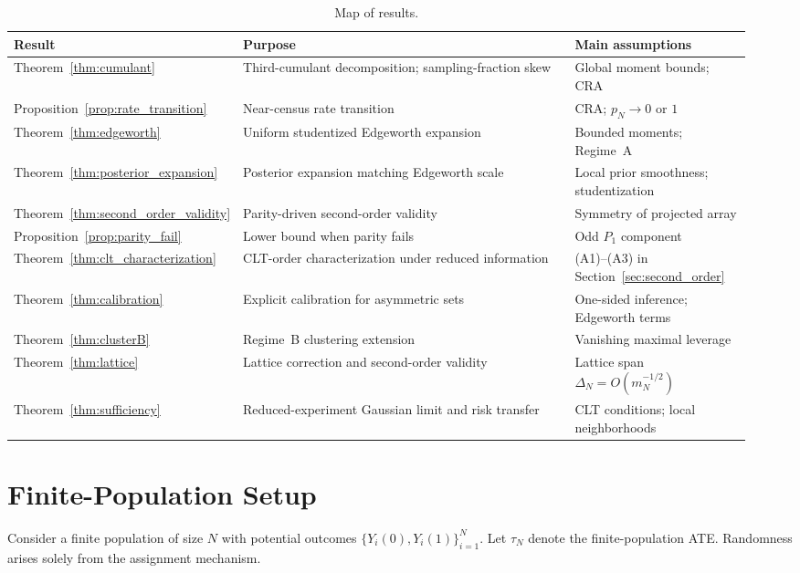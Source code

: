 \documentclass[aos]{imsart}
\theoremstyle{definition}
\theoremstyle{plain}
\newcommand{\mN}{m_N}
\begin{document}
\begin{table}[t]
\centering
\small
\setlength{\tabcolsep}{3pt}
\begin{tabular}{>{\raggedright\arraybackslash}p{0.25\linewidth}%
                >{\raggedright\arraybackslash}p{0.45\linewidth}%
                >{\raggedright\arraybackslash}p{0.24\linewidth}}
\toprule
Result & Purpose & Main assumptions \\
\midrule
Theorem~\ref{thm:cumulant} & Third-cumulant decomposition; sampling-fraction skew & Global moment bounds; CRA \\
Proposition~\ref{prop:rate_transition} & Near-census rate transition & CRA; $p_N\to 0$ or $1$ \\
Theorem~\ref{thm:edgeworth} & Uniform studentized Edgeworth expansion & Bounded moments; Regime~A \\
Theorem~\ref{thm:posterior_expansion} & Posterior expansion matching Edgeworth scale & Local prior smoothness; studentization \\
Theorem~\ref{thm:second_order_validity} & Parity-driven second-order validity & Symmetry of projected array \\
Proposition~\ref{prop:parity_fail} & Lower bound when parity fails & Odd $P_1$ component \\
Theorem~\ref{thm:clt_characterization} & CLT-order characterization under reduced information & (A1)--(A3) in Section~\ref{sec:second_order} \\
Theorem~\ref{thm:calibration} & Explicit calibration for asymmetric sets & One-sided inference; Edgeworth terms \\
Theorem~\ref{thm:clusterB} & Regime~B clustering extension & Vanishing maximal leverage \\
Theorem~\ref{thm:lattice} & Lattice correction and second-order validity & Lattice span $\Delta_N=O(\mN^{-1/2})$ \\
Theorem~\ref{thm:sufficiency} & Reduced-experiment Gaussian limit and risk transfer & CLT conditions; local neighborhoods \\
\bottomrule
\end{tabular}
\caption{Map of results.}
\label{tab:results_map}
\end{table}

\section{Finite-Population Setup}\label{sec:setup}

Consider a finite population of size $N$ with potential outcomes
$\{Y_i(0),Y_i(1)\}_{i=1}^N$.
Let $\tau_N$ denote the finite-population ATE.
Randomness arises solely from the assignment mechanism.
\end{document}
